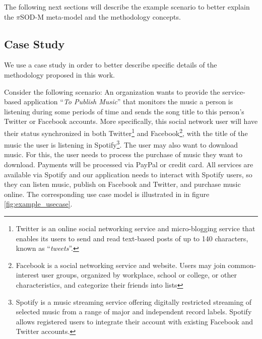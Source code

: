 The following next sections will describe the example scenario to better
 explain the $\pi$SOD-M meta-model and the methodology concepts.


\subsection{Case Study}
\label{sec:example}

We use a case study in order to better describe specific details of the
methodology proposed in this work. 


Consider the following scenario: An organization
wants to provide the service-based application ``\textit{To
Publish Music}'' that monitors the music a person is listening
during some periods of time and sends the song title to this
person's Twitter or Facebook accounts. More specifically, this social
network user will have their status synchronized in both Twitter\footnote{Twitter is an online social networking service and micro-blogging service that enables its
users to send and read text-based posts of up to 140 characters, known as
``\textit{tweets}''.} and Facebook\footnote{Facebook is a social networking
service and website. Users may join common-interest user groups, organized by
workplace, school or college, or other characteristics, and categorize their
friends into lists}, with the title of the music the user is listening
in Spotify\footnote{Spotify is a music streaming service offering digitally
restricted streaming of selected music from a range of major and independent
record labels. Spotify allows registered users to integrate their account with
existing Facebook and Twitter accounts.}. The user may
also want to download music. For this, the user needs to process the purchase of music
they want to download. Payments will be processed via PayPal or credit card. All services
are available via Spotify and our application needs to interact with Spotify
users, so they can listen music, publish on Facebook and Twitter, and
purchase music online.  The corresponding use case model is illustrated in in
figure \ref{fig:example_usecase}.



